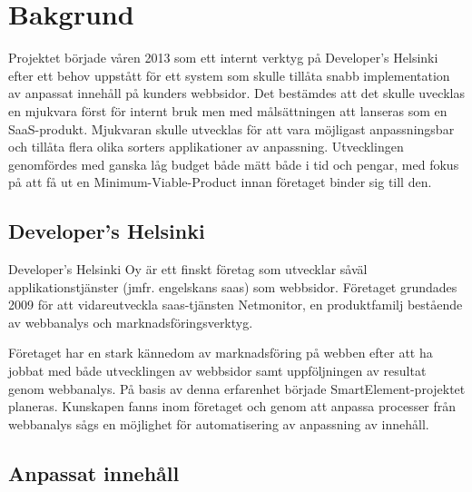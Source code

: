 \section{Bakgrund}

Projektet började våren 2013 som ett internt verktyg på Developer's Helsinki efter ett behov uppstått för ett system som skulle tillåta snabb implementation av anpassat innehåll på kunders webbsidor. Det bestämdes att det skulle uvecklas en mjukvara först för internt bruk men med målsättningen att lanseras som en SaaS-produkt. Mjukvaran skulle utvecklas för att vara möjligast anpassningsbar och tillåta flera olika sorters applikationer av anpassning. Utvecklingen genomfördes med ganska låg budget både mätt både i tid och pengar, med fokus på att få ut en Minimum-Viable-Product innan företaget binder sig till den.

\subsection{Developer's Helsinki}

Developer's Helsinki Oy är ett finskt företag som utvecklar såväl applikationstjänster (jmfr. engelskans \gls{saas}) som webbsidor. Företaget grundades 2009 för att vidareutveckla  \gls{saas}-tjänsten Netmonitor, en produktfamilj bestående av webbanalys och marknadsföringsverktyg.

Företaget har en stark kännedom av marknadsföring på webben efter att ha jobbat med både utvecklingen av webbsidor samt uppföljningen av resultat genom webbanalys. På basis av denna erfarenhet började SmartElement-projektet planeras. Kunskapen fanns inom företaget och genom att anpassa processer från webbanalys sågs en möjlighet för automatisering av anpassning av innehåll.

\subsection{Anpassat innehåll}

